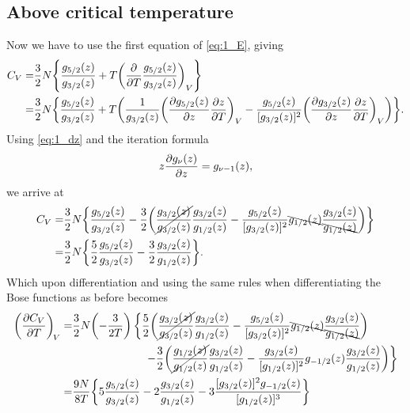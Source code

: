 \documentclass[11pt,letter, swedish, english
]{article}
\begin{document}
\subsection{Above critical temperature}
Now we have to use the first equation of \eqref{eq:1_E}, giving
\begin{equation}
\begin{aligned}
C_V=&\frac{3}{2}N\qty{\frac{g_{5/2}(z)}{g_{3/2}(z)}
+T\qty(\pdv{T}\frac{g_{5/2}(z)}{g_{3/2}(z)})_V}\\
=&\frac{3}{2}N\qty{\frac{g_{5/2}(z)}{g_{3/2}(z)}
+T\qty(\frac{1}{g_{3/2}(z)}\qty(\pdv{g_{5/2}(z)}{z}\pdv{z}{T})_V
-\frac{g_{5/2}(z)}{[g_{3/2}(z)]^2}\qty(\pdv{g_{3/2}(z)}{z}\pdv{z}{T})_V )
}.
\end{aligned}
\end{equation}
Using \eqref{eq:1_dz} and the iteration formula
\begin{equation}
z\pdv{g_\nu(z)}{z}=g_{\nu-1}(z),
\end{equation}
we arrive at
\begin{equation}
\begin{aligned}
C_V=&\frac{3}{2}N\qty{\frac{g_{5/2}(z)}{g_{3/2}(z)}
-\frac{3}{2}\qty(\cancel{\frac{g_{3/2}(z)}{g_{3/2}(z)}}\frac{g_{3/2}(z)}{g_{1/2}(z)}
-\frac{g_{5/2}(z)}{[g_{3/2}(z)]^2} \bcancel{g_{1/2}(z)} 
\frac{g_{3/2}(z)}{\bcancel{g_{1/2}(z)}}
)}\\
=&\frac{3}{2}N\qty{\frac{5}{2}\frac{g_{5/2}(z)}{g_{3/2}(z)}
-\frac{3}{2}\frac{g_{3/2}(z)}{g_{1/2}(z)}
}.
\end{aligned}
\end{equation}
Which upon differentiation and using the same rules when
differentiating the Bose functions as before becomes
\begin{equation}
\begin{aligned}
\qty(\pdv{C_V}{T})_{\!V}
=&\frac{3}{2}N\qty(-\frac{3}{2T})\left\{
\frac{5}{2}\qty(\cancel{\frac{g_{3/2}(z)}{g_{3/2}(z)}}\frac{g_{3/2}(z)}{g_{1/2}(z)}
-\frac{g_{5/2}(z)}{[g_{3/2}(z)]^2} \bcancel{g_{1/2}(z)} 
\frac{g_{3/2}(z)}{\bcancel{g_{1/2}(z)}}
)\right.\\
&\hspace{65pt}\left.
-\frac{3}{2}\qty(\cancel{\frac{g_{1/2}(z)}{g_{1/2}(z)}}\frac{g_{3/2}(z)}{g_{1/2}(z)}
-\frac{g_{3/2}(z)}{[g_{1/2}(z)]^2} g_{-1/2}(z)
\frac{g_{3/2}(z)}{g_{1/2}(z)}
)\right\}\\
=&\frac{9N}{8T}\qty{
5\frac{g_{5/2}(z)}{g_{3/2}(z)}
-2\frac{g_{3/2}(z)}{g_{1/2}(z)}
-3\frac{[g_{3/2}(z)]^2 g_{-1/2}(z)}{[g_{1/2}(z)]^3}
}
\end{aligned}
\end{equation}
\end{document}
